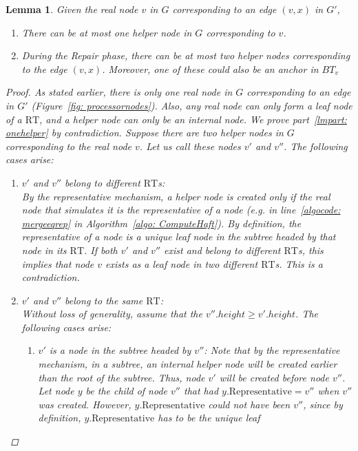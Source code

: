 \documentclass[11pt, letter]{article}
\newtheorem{lemma}{Lemma}
\newcommand{\RT}{\mathrm{RT}}
\newcommand{\representative}{\mathrm{Representative}}
\begin{document}
\begin{lemma}
\label{lemma: hnodecounts}
Given the real node $v$ in $G$ corresponding to an edge $(v,x)$ in $G'$,
\begin{enumerate}
\item \label{lmpart: onehelper} There can be at most one helper node in $G$ corresponding to $v$.
\item  \label{lmpart: twohelper} During the Repair phase, there can be at most two helper nodes corresponding to the edge $(v,x)$. Moreover, one of these could also be an anchor in $BT_{v}$
\end{enumerate}
\begin{proof}
 As stated earlier, there is only one real node in $G$ corresponding to an edge in $G'$ (Figure~\ref{fig:
processornodes}). Also, any real node can only form a leaf node of a $\RT$, and a helper node can only be an
internal node. We prove  part~\ref{lmpart: onehelper} by contradiction. Suppose there are two helper nodes in $G$ corresponding to
the real node $v$. Let us call these nodes $v'$ and $v''$. The following cases arise:
\begin{enumerate}
\item \emph{$v'$ and $v''$ belong to different $\RT$s:}\\
 By the representative mechanism, a helper node is created only if the real node that simulates it is the representative
of a node (e.g. in line~\ref{algocode: mergeeqrep} in Algorithm~\ref{algo: ComputeHaft}). By definition, the
representative of a node is a unique leaf node in the subtree headed by that node in its $\RT$. If both $v'$ and $v''$
exist and  belong to different $\RT$s, this implies that node $v$ exists as a leaf node in two different $\RT$s. This is
a contradiction.
\item \emph{$v'$ and $v''$ belong to the same $\RT$:}\\
 Without loss of generality, assume that the  $v''. height \ge v'.height$. The following cases arise:
 \begin{enumerate}
  \item \emph{$v'$ is a node in the subtree headed by $v''$:}
     Note that by the representative mechanism, in a subtree, an internal helper node will be created earlier than the
root of the subtree. Thus, node $v'$ will be created before node $v''$.
Let node $y$ be the child of node $v''$ that had $y.\representative = v''$ when $v''$ was created. However, 
   $y.\representative$ could not have been $v''$, since by definition, $y.\representative$ has to be the unique leaf 

\end{enumerate}
\end{enumerate}
\end{proof}
\end{lemma}
\end{document}
